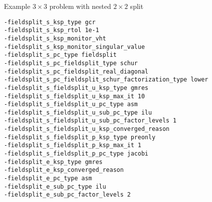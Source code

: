 \begin{frame}[fragile]{Example $3\times 3$ problem with nested $2\times 2$ split}
\begin{Verbatim}[formatcom=\footnotesize]
-fieldsplit_s_ksp_type gcr
-fieldsplit_s_ksp_rtol 1e-1
-fieldsplit_s_ksp_monitor_vht
-fieldsplit_s_ksp_monitor_singular_value
-fieldsplit_s_pc_type fieldsplit
-fieldsplit_s_pc_fieldsplit_type schur
-fieldsplit_s_pc_fieldsplit_real_diagonal
-fieldsplit_s_pc_fieldsplit_schur_factorization_type lower
-fieldsplit_s_fieldsplit_u_ksp_type gmres
-fieldsplit_s_fieldsplit_u_ksp_max_it 10
-fieldsplit_s_fieldsplit_u_pc_type asm
-fieldsplit_s_fieldsplit_u_sub_pc_type ilu
-fieldsplit_s_fieldsplit_u_sub_pc_factor_levels 1
-fieldsplit_s_fieldsplit_u_ksp_converged_reason
-fieldsplit_s_fieldsplit_p_ksp_type preonly
-fieldsplit_s_fieldsplit_p_ksp_max_it 1
-fieldsplit_s_fieldsplit_p_pc_type jacobi
-fieldsplit_e_ksp_type gmres
-fieldsplit_e_ksp_converged_reason
-fieldsplit_e_pc_type asm
-fieldsplit_e_sub_pc_type ilu
-fieldsplit_e_sub_pc_factor_levels 2
\end{Verbatim}
\end{frame}
